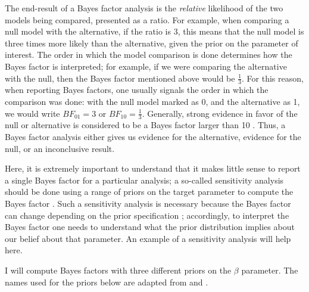 \documentclass{ar-1col}\usepackage[]{graphicx}\usepackage[]{color}
\begin{document}
The end-result of a Bayes factor analysis is the \textit{relative} likelihood of the two models being compared, presented  as a ratio. For example, when comparing a null model with the alternative, if the ratio is $3$, this means that the null model is three times more likely than the alternative, given the prior on the parameter of interest. The order in which the model comparison is done determines how the Bayes factor is interpreted; for example, if we were comparing the alternative with the null, then the Bayes factor mentioned above would be $\frac{1}{3}$. For this reason, when reporting Bayes factors, one usually signals the order in which the comparison was done: with the null model marked as 0, and the alternative as 1, we would write $BF_{01} = 3$ or $BF_{10}=\frac{1}{3}$. Generally, strong evidence in favor of the null or alternative is considered to be a Bayes factor larger than 10 \citep[this follows from a suggested scale in][]{jeffreys1998theory}. Thus, a Bayes factor analysis either gives us evidence for the alternative, evidence for the null, or an inconclusive result. 

Here, it is extremely important to understand that it makes little sense to report a single Bayes factor for a particular analysis; a so-called sensitivity analysis should be done using a range of priors on the target parameter to compute the Bayes factor \citep{SchadEtAlBF}. Such a sensitivity analysis is necessary because the Bayes factor can change depending on the prior specification \citep{lee2014bayesian}; accordingly, to interpret the Bayes factor one needs to understand what the prior distribution implies about our belief about that parameter.  An example of a sensitivity analysis will help here.

I will compute Bayes factors with three different priors on the $\beta$ parameter. The names used for the priors below are adapted from \citet{spiegelhalter1994bayesian} and \citet{Gelman14}.
\end{document}
